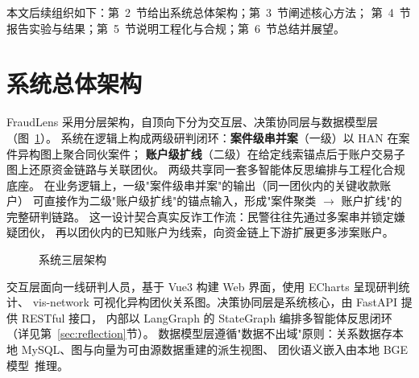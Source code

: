 \documentclass[12pt,a4paper]{ctexart}
\begin{document}
本文后续组织如下：第~2~节给出系统总体架构；第~3~节阐述核心方法；
第~4~节报告实验与结果；第~5~节说明工程化与合规；第~6~节总结并展望。

\section{系统总体架构}
\label{sec:arch}

FraudLens 采用分层架构，自顶向下分为交互层、决策协同层与数据模型层（图~\ref{fig:arch}）。
系统在逻辑上构成两级研判闭环：\textbf{案件级串并案}（一级）以 HAN 在案件异构图上聚合同伙案件；
\textbf{账户级扩线}（二级）在给定线索锚点后于账户交易子图上还原资金链路与关联团伙。
两级共享同一套多智能体反思编排与工程化合规底座。
在业务逻辑上，一级"案件级串并案"的输出（同一团伙内的关键收款账户）
可直接作为二级"账户级扩线"的锚点输入，形成"案件聚类 $\to$ 账户扩线"的完整研判链路。
这一设计契合真实反诈工作流：民警往往先通过多案串并锁定嫌疑团伙，
再以团伙内的已知账户为线索，向资金链上下游扩展更多涉案账户。

\begin{figure}[htbp]
  \centering
  \caption{系统三层架构}
  \label{fig:arch}
\end{figure}

交互层面向一线研判人员，基于 Vue3 构建 Web 界面，使用 ECharts 呈现研判统计、
vis-network 可视化异构团伙关系图。决策协同层是系统核心，由 FastAPI 提供 RESTful 接口，
内部以 LangGraph 的 StateGraph 编排多智能体反思闭环（详见第~\ref{sec:reflection}节）。
数据模型层遵循"数据不出域"原则：关系数据存本地 MySQL、图与向量为可由源数据重建的派生视图、
团伙语义嵌入由本地 BGE 模型~\cite{bge2023}推理。
\end{document}
